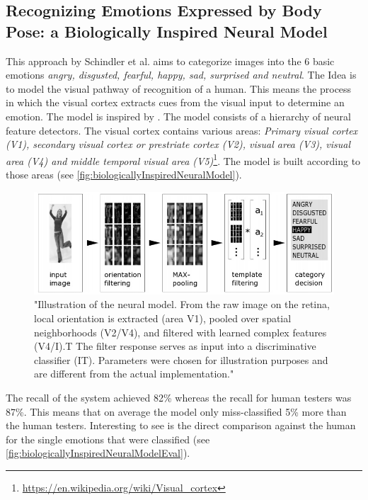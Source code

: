 \documentclass[conference]{IEEEtran}
\begin{document}
\subsection{Recognizing Emotions Expressed by Body Pose: a Biologically Inspired Neural Model}
This approach by Schindler et al.\cite{schindler2008recognizing} aims to categorize images into the 6 basic emotions\cite{eckman2003emotions} \emph{angry, disgusted, fearful, happy, sad, surprised and neutral}. The Idea is to model the visual pathway of recognition of a human. This means the process in which the visual cortex extracts cues from the visual input to determine an emotion\cite{schindler2008recognizing}. The model is inspired by \cite{riesenhuber1999hierarchical,serre2007robust}. 
The model consists of a hierarchy of neural feature detectors\cite{schindler2008recognizing}. The visual cortex contains various areas: \emph{Primary visual cortex (V1), secondary visual cortex or prestriate cortex (V2), visual area (V3), visual area (V4) and middle temporal visual area (V5)}\footnote{\url{https://en.wikipedia.org/wiki/Visual_cortex}}. The model is built according to those areas (see \autoref{fig:biologicallyInspiredNeuralModel}). 
\begin{figure}[H]
\centering
\includegraphics[width=\linewidth]{biologicallyInspiredNeuralModel.jpg}
\caption{"Illustration of the neural model. From the raw image on the retina, local orientation is extracted (area V1), pooled over spatial neighborhoods (V2/V4), and filtered with learned complex features (V4/I).T The filter response serves as input
into a discriminative classifier (IT). Parameters were chosen for illustration purposes and are different from the actual implementation."\cite{schindler2008recognizing}}
\label{fig:biologicallyInspiredNeuralModel}
\end{figure}

The recall of the system achieved 82\% whereas the recall for human testers was 87\%. This means that on average the model only miss-classified 5\% more than the human testers. Interesting to see is the direct comparison against the human for the single emotions that were classified (see \autoref{fig:biologicallyInspiredNeuralModelEval}).
\end{document}
